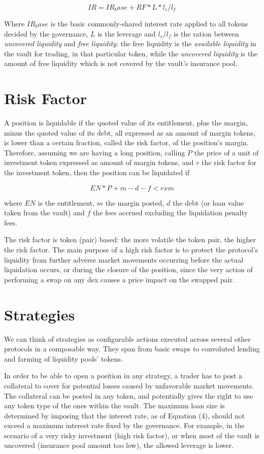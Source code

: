 \documentclass[a4paper,10 pt]{article}
\theoremstyle{definition}
\begin{document}
$$IR = IR_base + RF * L * l_c/l_f$$

Where $IR_base$ is the basic commonly-shared interest rate applied to all tokens decided by the governance, $L$ is the leverage and $l_c/l_f$ is the ration between {\it uncovered liquidity} and {\it free liquidity}: the free liquidity is the {\it available liquidity} in the vault for trading, in that particular token, while the {\it uncovered liquidity} is the amount of free liquidity which is not covered by the vault’s insurance pool.

\section{Risk Factor}
A position is liquidable if the quoted value of its entitlement, plus the margin, minus the quoted value of its debt, all expressed as an amount of margin tokens, is lower than a certain fraction, called the risk factor,
of the position’s margin. Therefore, assuming we are having a long position, calling $P$ the price of a unit of investment token expressed as amount of margin tokens, and $r$ the risk factor for the investment token, then the position can be liquidated if 

$$EN * P + m - d - f < r x m $$

where $EN$ is the entitlement, $m$ the margin posted, $d$ the debt (or loan value taken from the vault) and $f$ the fees accrued excluding the liquidation penalty fees.

The risk factor is token (pair) based: the more volatile the token pair, the higher the risk factor. The main purpose of a high risk factor is to protect the protocol’s liquidity from further adverse market movements occurring before the actual liquidation occurs, or during the closure of the position, since the very action of performing a swap on any dex causes a price impact on the swapped pair.


\section{Strategies}
We can think of strategies as configurable actions executed across several other protocols in a composable way. They span from basic swaps to convoluted lending and farming of liquidity pools' tokens.

In order to be able to open a position in any strategy, a trader has to post a collateral to cover for potential losses caused by unfavorable market movements. The collateral can be posted in any token, and potentially gives the right to use any token type of the ones within the vault. The maximum loan size is determined by imposing that the interest rate, as of Equation (4), should not exceed a maximum interest rate fixed by the governance. For example, in the scenario of a very risky investment (high risk factor), or when most of the vault is uncovered (insurance pool amount too low), the allowed leverage is lower.
\end{document}
